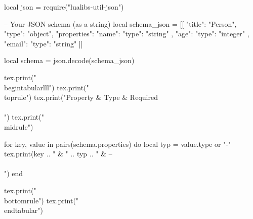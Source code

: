 \documentclass{article}
\begin{document}
\begin{luacode}
local json = require("lualibs-util-json")

-- Your JSON schema (as a string)
local schema_json = [[
{
  "title": "Person",
  "type": "object",
  "properties": {
    "name": { "type": "string" },
    "age": { "type": "integer" },
    "email": { "type": "string" }
  }
}
]]

local schema = json.decode(schema_json)

tex.print("\\begin{tabular}{lll}")
tex.print("\\toprule")
tex.print("Property & Type & Required \\\\")
tex.print("\\midrule")

for key, value in pairs(schema.properties) do
  local typ = value.type or "-"
  tex.print(key .. " & " .. typ .. " & -- \\\\")
end

tex.print("\\bottomrule")
tex.print("\\end{tabular}")
\end{luacode}
\end{document}
